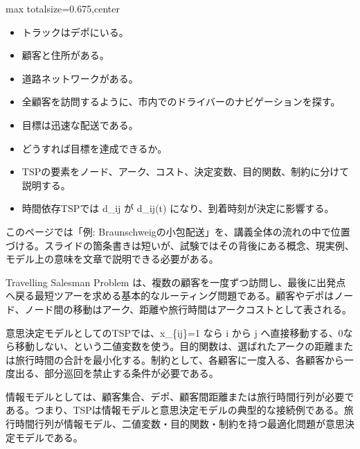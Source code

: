 \clearpage
{}
\begin{adjustbox}{max totalsize={\textwidth}{0.675\textheight},center}
\begin{minipage}{\textwidth}\scriptsize
\begin{minipage}[t]{0.485\textwidth}
\begin{itemize}
\item トラックはデポにいる。
\item 顧客と住所がある。
\item 道路ネットワークがある。
\item 全顧客を訪問するように、市内でのドライバーのナビゲーションを探す。
\item 目標は迅速な配送である。
\item どうすれば目標を達成できるか。
\end{itemize}
\begin{itemize}
\item TSPの要素をノード、アーク、コスト、決定変数、目的関数、制約に分けて説明する。
\item 時間依存TSPでは d\_ij が d\_ij(t) になり、到着時刻が決定に影響する。
\end{itemize}
\end{minipage}\hfill
\begin{minipage}[t]{0.485\textwidth}
このページでは「例: Braunschweigの小包配送」を、講義全体の流れの中で位置づける。スライドの箇条書きは短いが、試験ではその背後にある概念、現実例、モデル上の意味を文章で説明できる必要がある。\par
Travelling Salesman Problem は、複数の顧客を一度ずつ訪問し、最後に出発点へ戻る最短ツアーを求める基本的なルーティング問題である。顧客やデポはノード、ノード間の移動はアーク、距離や旅行時間はアークコストとして表される。\par
意思決定モデルとしてのTSPでは、x\_\{ij\}=1 なら i から j へ直接移動する、0なら移動しない、という二値変数を使う。目的関数は、選ばれたアークの距離または旅行時間の合計を最小化する。制約として、各顧客に一度入る、各顧客から一度出る、部分巡回を禁止する条件が必要である。\par
情報モデルとしては、顧客集合、デポ、顧客間距離または旅行時間行列が必要である。つまり、TSPは情報モデルと意思決定モデルの典型的な接続例である。旅行時間行列が情報モデル、二値変数・目的関数・制約を持つ最適化問題が意思決定モデルである。\par

\end{minipage}
\end{minipage}
\end{adjustbox}
